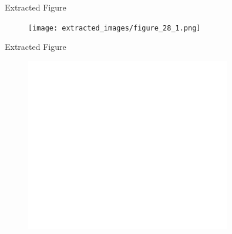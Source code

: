 \documentclass{beamer}
\begin{document}
\begin{frame}{Extracted Figure}
    \centering
    \begin{figure}
        \texttt{[image: extracted\_images/figure\_28\_1.png]}  %
    \end{figure}
\end{frame}

\begin{frame}{Extracted Figure}
    \centering
    \begin{figure}
        \includegraphics[width=0.8\textwidth]{extracted_images/figure_29_1.png}  %
    \end{figure}
\end{frame}
\end{document}

